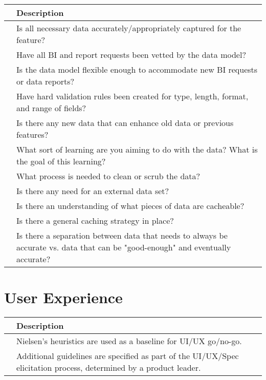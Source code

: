 \documentclass{article}
\begin{document}
\begin{center}
    \begin{tabular}{ | p{.25cm} || p{10cm} |}
    \hline
     & Description \\ \hline
     & Is all necessary data accurately/appropriately captured for the feature? \\ \hline
     & Have all BI and report requests been vetted by the data model? \\ \hline
     & Is the data model flexible enough to accommodate new BI requests or data reports? \\ \hline
     & Have hard validation rules been created for type, length, format, and range of fields? \\ \hline
     & Is there any new data that can enhance old data or previous features? \\ \hline
     & What sort of learning are you aiming to do with the data? What is the goal of this learning? \\ \hline
     & What process is needed to clean or scrub the data? \\ \hline
     & Is there any need for an external data set? \\ \hline
     & Is there an understanding of what pieces of data are cacheable? \\ \hline
     & Is there a general caching strategy in place? \\ \hline
     & Is there a separation between data that needs to always be accurate vs. data that can be "good-enough" and eventually accurate? \\ \hline
    \end{tabular}
\end{center}


\section{User Experience}

\begin{center}
    \begin{tabular}{ | p{.25cm} || p{10cm} |}
    \hline
     & Description \\ \hline
     & Nielsen's heuristics are used as a baseline for UI/UX go/no-go. \\ \hline
     & Additional guidelines are specified as part of the UI/UX/Spec elicitation process, determined by a product leader. \\ \hline
    \end{tabular}
\end{center}
\end{document}
